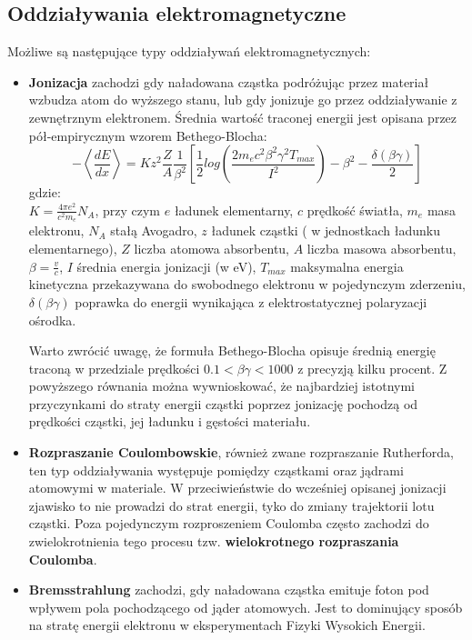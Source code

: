 \subsection{Oddziaływania elektromagnetyczne}
Możliwe są następujące typy oddziaływań elektromagnetycznych:
\begin{itemize}
\item \textbf{Jonizacja} zachodzi gdy naładowana cząstka podróżując przez materiał wzbudza atom do wyższego stanu, lub gdy jonizuje go przez oddziaływanie z zewnętrznym elektronem. Średnia wartość traconej energii jest opisana przez pół-empirycznym wzorem Bethego-Blocha\cite{Bete}: 
\begin{equation}
-\left< \frac{dE}{dx} \right> = Kz^2\frac{Z}{A}\frac{1}{\beta^2}\left[\frac{1}{2}log\left(\frac{2m_ec^2\beta^2\gamma^2T_{max}}{I^2}\right) -\beta^2-\frac{\delta(\beta\gamma)}{2} \right]
\label{bethe}
\end{equation}
gdzie: \\
$K=\frac{4\pi e^2}{c^2m_e}N_A$, przy czym $e$ ładunek elementarny, $c$ prędkość światła, $m_e$ masa elektronu, $N_A$ stałą Avogadro, $z$ ładunek cząstki ( w jednostkach ładunku elementarnego), $Z$ liczba atomowa absorbentu, $A$ liczba masowa absorbentu, $\beta=\frac{v}{c}$, $I$ średnia energia jonizacji (w eV), $T_{max}$ maksymalna energia kinetyczna przekazywana do swobodnego elektronu w pojedynczym zderzeniu, $\delta(\beta\gamma)$ poprawka do energii wynikająca z elektrostatycznej polaryzacji ośrodka.

Warto zwrócić uwagę, że formuła Bethego-Blocha opisuje średnią energię traconą w przedziale prędkości $0.1<\beta\gamma<1000$ z precyzją kilku procent. Z powyższego równania można wywnioskować, że najbardziej istotnymi przyczynkami do straty energii cząstki poprzez jonizację pochodzą od prędkości cząstki, jej ładunku i gęstości materiału.

\item \textbf{Rozpraszanie Coulombowskie}, również zwane rozpraszanie Rutherforda, ten typ oddziaływania występuje pomiędzy cząstkami oraz jądrami atomowymi w materiale. W przeciwieństwie do wcześniej opisanej jonizacji zjawisko to nie prowadzi do strat energii, tyko do zmiany trajektorii lotu cząstki. Poza pojedynczym rozproszeniem Coulomba często zachodzi do zwielokrotnienia tego procesu tzw. \textbf{wielokrotnego rozpraszania Coulomba}.

\item \textbf{Bremsstrahlung} zachodzi, gdy naładowana cząstka emituje foton pod wpływem pola pochodzącego od jąder atomowych. Jest to dominujący sposób na stratę energii elektronu w eksperymentach Fizyki Wysokich Energii.
\end{itemize}
